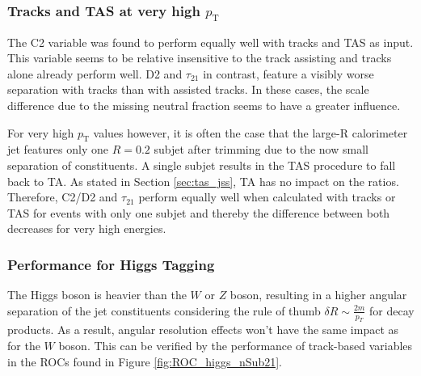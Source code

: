 \subsubsection{Tracks and TAS at very high $p_{\mathrm{T}}$}
The C2 variable was found to perform equally well with tracks and TAS as input. This variable seems to be relative insensitive to the track assisting and tracks alone already perform well. D2 and $\tau_{21}$ in contrast, feature a visibly worse separation with tracks than with assisted tracks. In these cases, the scale difference due to the missing neutral fraction seems to have a greater influence.

For very high $p_{\mathrm{T}}$ values however, it is often the case that the large-R calorimeter jet features only one $R = 0.2$ subjet after trimming due to the now small separation of constituents. A single subjet results in the TAS procedure to fall back to TA. As stated in Section \ref{sec:tas_jss}, TA has no impact on the ratios. Therefore, C2/D2 and $\tau_{21}$ perform equally well when calculated with tracks or TAS for events with only one subjet and thereby the difference between both decreases for very high energies. 



\subsubsection{Performance for Higgs Tagging}\label{subsubsec:higgs_beta1}
The Higgs boson is heavier than the $W$ or $Z$ boson, resulting in a higher angular separation of the jet constituents considering the rule of thumb $\delta R \sim \frac{2m}{p_T}$ for decay products. As a result, angular resolution effects won't have the same impact as for the $W$ boson. This can be verified by the performance of track-based variables in the ROCs found in Figure \ref{fig:ROC_higgs_nSub21}.

